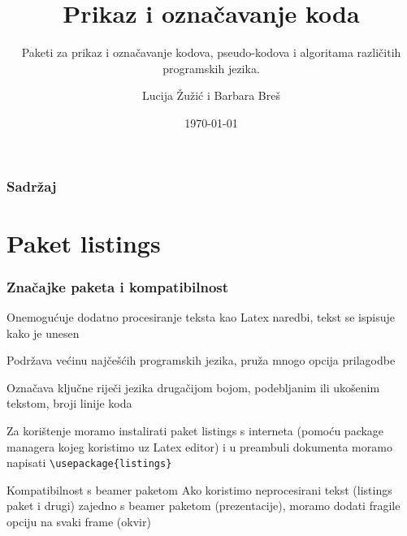 \documentclass{beamer}
\title{Prikaz i označavanje koda}
\subtitle{Paketi za prikaz i označavanje kodova, pseudo-kodova i algoritama različitih programskih jezika.}
\author{Lucija Žužić i  Barbara Breš}
\institute{Sveučilište u Rijeci, Tehnički fakultet}
\date{\today}
\begin{document}
 
	\begin{frame}	
		\titlepage	
	\end{frame}	

	\begin{frame}
		\frametitle{Sadržaj}
		\tableofcontents
	\end{frame}

	\section{Paket listings}	

	\begin{frame}[fragile]
		\frametitle{Značajke paketa i kompatibilnost}
		\begin{itemize}
			\begin{item}
				 Onemogućuje dodatno procesiranje teksta kao Latex naredbi, tekst se ispisuje kako je unesen  
			\end{item}
			\begin{item}
				Podržava većinu najčešćih programskih jezika, pruža mnogo opcija prilagodbe
			\end{item}
			\begin{item}
				Označava ključne riječi jezika drugačijom bojom, podebljanim ili ukošenim tekstom, broji linije koda
			\end{item}
			\begin{item}	
				Za korištenje moramo instalirati paket listings s interneta (pomoću package managera kojeg koristimo uz Latex editor) i u preambuli dokumenta moramo napisati \verb|\usepackage{listings}| 
			\end{item}
		\end{itemize}
		\begin{alertblock}{Kompatibilnost s beamer paketom}
				Ako koristimo neprocesirani tekst (listings paket i drugi) zajedno s beamer paketom (prezentacije), moramo dodati fragile opciju na svaki frame (okvir)
		\end{alertblock}
	\end{frame}
	
\end{document}
